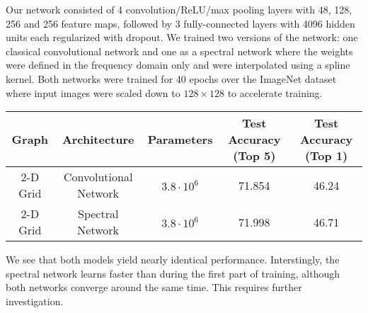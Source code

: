 \documentclass{article} %
\begin{document}
Our network consisted of 4 convolution/ReLU/max pooling layers with 48, 128, 256 and 256 feature maps, followed by 3 fully-connected layers with 4096 hidden units each regularized with dropout. We trained two versions of the network: one classical convolutional network and one as a spectral network where the weights were defined in the frequency domain only and were interpolated using a spline kernel. Both networks were trained for 40 epochs over the ImageNet dataset where input images were scaled down to $128 \times 128$ to accelerate training.  

\begin{center}
\begin{tabular}{|c|c|c|c|c|}
\hline
Graph & Architecture & Parameters & Test Accuracy (Top 5) & Test Accuracy (Top 1)\\
\hline
2-D Grid & Convolutional Network & $3.8 \cdot 10^6$ & 71.854 & 46.24\\
2-D Grid & Spectral Network & $3.8\cdot 10^6$ & 71.998 & 46.71\\
\hline
\end{tabular}
\end{center}

We see that both models yield nearly identical performance. Interstingly, the spectral network learns faster than during the first part of training, although both networks converge around the same time. This requires further investigation.




{}

\end{document}
